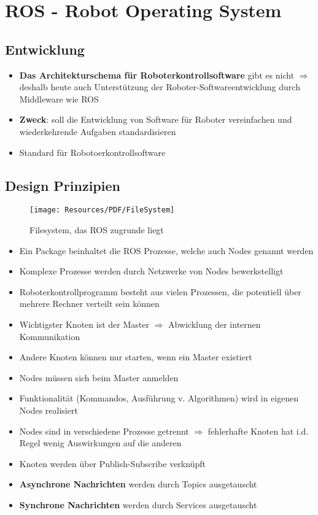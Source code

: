 \section{ROS - Robot Operating System}
\subsection{Entwicklung}
\begin{itemize}
	\item \textbf{Das Architekturschema für Roboterkontrollsoftware} gibt es nicht $\Rightarrow$ deshalb heute auch Unterstützung der Roboter-Softwareentwicklung durch Middleware wie ROS
	\item \textbf{Zweck}: soll die Entwicklung von Software für Roboter vereinfachen und wiederkehrende Aufgaben standardisieren
	\item Standard für Robotoerkontrollsoftware
\end{itemize}
\subsection{Design Prinzipien}
\begin{figure}[H]
	\begin{center}
		\texttt{[image: Resources/PDF/FileSystem]}
		\caption{Filesystem, das ROS zugrunde liegt}
		\label{fig:PDF/FileSystem}
	\end{center}
\end{figure}
\begin{itemize}
	\item Ein Package beinhaltet die ROS Prozesse, welche auch Nodes genannt werden
	\item Komplexe Prozesse werden durch Netzwerke von Nodes bewerkstelligt
	\item Roboterkontrollprogramm besteht aus vielen Prozessen, die potentiell über mehrere Rechner verteilt sein können
	\item Wichtigster Knoten ist der Master $\Rightarrow$ Abwicklung der internen Kommunikation
	\item Andere Knoten können nur starten, wenn ein Master existiert
	\item Nodes müssen sich beim Master anmelden
	\item Funktionalität (Kommandos, Ausführung v. Algorithmen) wird in eigenen Nodes realisiert
	\item Nodes sind in verschiedene Prozesse getrennt $\Rightarrow$ fehlerhafte Knoten hat i.d. Regel wenig Auswirkungen auf die anderen
	\item Knoten werden über Publish-Subscribe verknüpft
	\item \textbf{Asynchrone Nachrichten} werden durch Topics ausgetauscht
	\item \textbf{Synchrone Nachrichten} werden durch Services ausgetauscht
\end{itemize}
